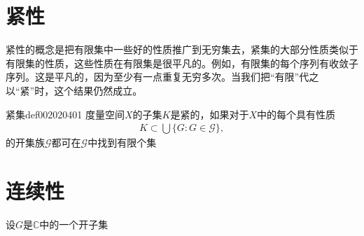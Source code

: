 \section{紧性}\label{section0020204}
紧性的概念是把有限集中一些好的性质推广到无穷集去，紧集的大部分性质类似于有限集的性质，这些性质在有限集是很平凡的。例如，有限集的每个序列有收敛子序列。这是平凡的，因为至少有一点重复无穷多次。当我们把“有限”代之以“紧”时，这个结果仍然成立。

\begin{definition}{紧集}{def002020401}
度量空间$X$的子集$K$是紧的，如果对于$X$中的每个具有性质
\begin{gather}\label{equ002020402}
K \subset \bigcup\{G: G \in \mathscr{G}\},
\end{gather}
的开集族$\mathscr{G}$都可在$\mathscr{G}$中找到有限个集
\end{definition}




\section{连续性}\label{section0020205}

\begin{exercise}\label{exer002020507}
设$G$是$\mathbb{C}$中的一个开子集
\end{exercise}





